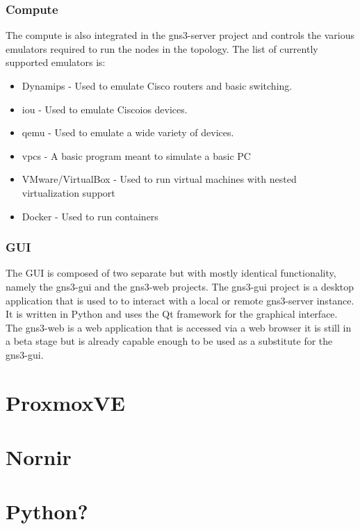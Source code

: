 \subsubsection{Compute}
The compute is also integrated in the gns3-server project and controls the various emulators required to run the nodes 
in the topology.
The list of currently supported emulators is:

\begin{itemize}
    \item Dynamips - Used to emulate Cisco routers and basic switching.
    \item \ac{iou} - Used to emulate Cisco\ac{ios} devices.
    \item \ac{qemu} - Used to emulate a wide variety of devices.
    \item \ac{vpcs} - A basic program meant to simulate a basic PC
    \item VMware/VirtualBox - Used to run virtual machines with nested virtualization support
    \item Docker - Used to run containers
  \end{itemize}

\subsubsection{GUI}
The GUI is composed of two separate but with mostly identical functionality, namely the gns3-gui and the gns3-web projects.
The gns3-gui project is a desktop application that is used to to interact with a local or remote gns3-server instance. It 
is written in Python and uses the Qt framework for the graphical interface. The gns3-web is a web application that is 
accessed via a web browser it is still in a beta stage but is already capable enough to be used as a substitute for the 
gns3-gui.


\section{ProxmoxVE}

\section{Nornir}

\section{Python?}



